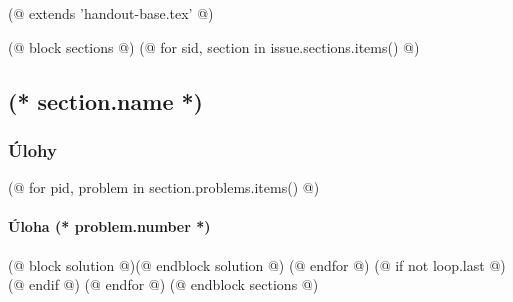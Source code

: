 (@ extends 'handout-base.tex' @)

(@ block sections @)
    (@ for sid, section in issue.sections.items() @)
        \subsection{(* section.name *)}
        \subsubsection{Úlohy}
        (@ for pid, problem in section.problems.items() @)
            \paragraph{Úloha (* problem.number *)}
            (@ block solution @)(@ endblock solution @)
        (@ endfor @)
        (@ if not loop.last @)\newpage(@ endif @)
    (@ endfor @)
(@ endblock sections @)
